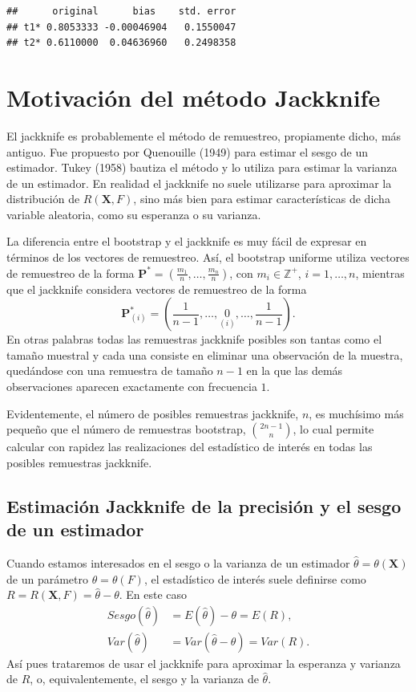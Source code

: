 \documentclass[]{book}
\theoremstyle{definition}
\theoremstyle{definition}
\theoremstyle{definition}
\theoremstyle{remark}
\begin{document}
\begin{verbatim}
##      original      bias    std. error
## t1* 0.8053333 -0.00046904   0.1550047
## t2* 0.6110000  0.04636960   0.2498358
\end{verbatim}

\chapter{Motivación del método Jackknife}\label{cap3}

El jackknife es probablemente el método de remuestreo, propiamente
dicho, más antiguo. Fue propuesto por Quenouille (1949) para estimar el
sesgo de un estimador. Tukey (1958) bautiza el método y lo utiliza para
estimar la varianza de un estimador. En realidad el jackknife no suele
utilizarse para aproximar la distribución de
\(R\left( \mathbf{X},F \right)\), sino más bien para estimar
características de dicha variable aleatoria, como su esperanza o su
varianza.

La diferencia entre el bootstrap y el jackknife es muy fácil de expresar
en términos de los vectores de remuestreo. Así, el bootstrap uniforme
utiliza vectores de remuestreo de la forma
\(\mathbf{P}^{\ast}=\left( \frac{m_1}{n},\ldots ,\frac{m_n}{n} \right)\),
con \(m_i\in \mathbb{Z}^{+}\), \(i=1,\ldots ,n\), mientras que el
jackknife considera vectores de remuestreo de la forma
\[\mathbf{P}_{(i)}^{\ast}=\left( \frac{1}{n-1},\ldots ,\underset{(i)}{0}
,\ldots ,\frac{1}{n-1} \right).\] En otras palabras todas las remuestras
jackknife posibles son tantas como el tamaño muestral y cada una
consiste en eliminar una observación de la muestra, quedándose con una
remuestra de tamaño \(n-1\) en la que las demás observaciones aparecen
exactamente con frecuencia \(1\).

Evidentemente, el número de posibles remuestras jackknife, \(n\), es
muchísimo más pequeño que el número de remuestras bootstrap,
\(\binom{2n-1}{n}\), lo cual permite calcular con rapidez las
realizaciones del estadístico de interés en todas las posibles
remuestras jackknife.

\section{Estimación Jackknife de la precisión y el sesgo de un
estimador}\label{estimacion-jackknife-de-la-precision-y-el-sesgo-de-un-estimador}

Cuando estamos interesados en el sesgo o la varianza de un estimador
\(\hat{\theta}=\theta \left( \mathbf{X} \right)\) de un parámetro
\(\theta =\theta \left( F \right)\), el estadístico de interés suele
definirse como \(R=R\left( \mathbf{X},F \right) =\hat{\theta}-\theta\).
En este caso \[\begin{aligned}
Sesgo\left( \hat{\theta} \right) &= E\left( \hat{\theta} \right) -\theta
=E\left( R \right), \\
Var\left( \hat{\theta} \right) &= Var\left( \hat{\theta}-\theta \right)
=Var\left( R \right).
\end{aligned}\] Así pues trataremos de usar el jackknife para aproximar
la esperanza y varianza de \(R\), o, equivalentemente, el sesgo y la
varianza de \(\hat{\theta}\).
\end{document}
